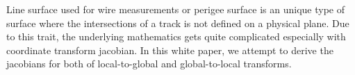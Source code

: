 
Line surface used for wire measurements or perigee surface is an unique type of surface where the intersections of a track is not defined on a physical plane. Due to this trait, the underlying mathematics gets quite complicated especially with coordinate transform jacobian. In this white paper, we attempt to derive the jacobians for both of local-to-global and global-to-local transforms.